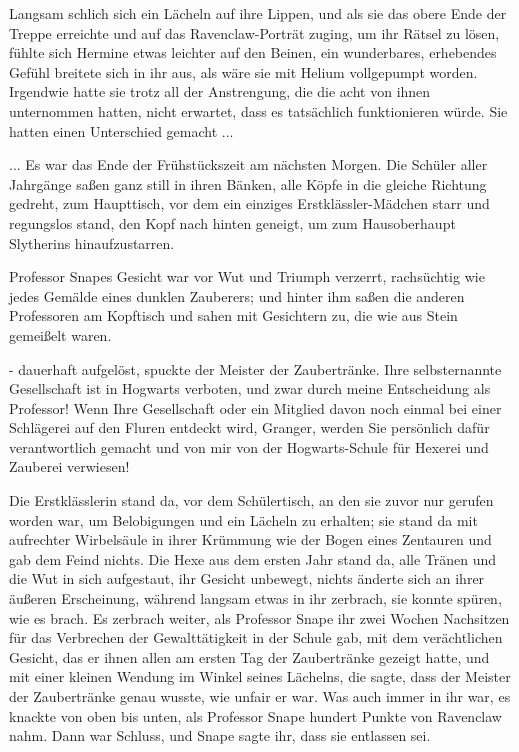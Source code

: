 Langsam schlich sich ein Lächeln auf ihre Lippen, und als sie das obere Ende der
Treppe erreichte und auf das Ravenclaw-Porträt zuging, um ihr Rätsel zu lösen,
fühlte sich Hermine etwas leichter auf den Beinen, ein wunderbares, erhebendes
Gefühl breitete sich in ihr aus, als wäre sie mit Helium vollgepumpt worden.
Irgendwie hatte sie trotz all der Anstrengung, die die acht von ihnen
unternommen hatten, nicht erwartet, dass es tatsächlich funktionieren würde. Sie
hatten einen Unterschied gemacht ...

... Es war das Ende der Frühstückszeit am nächsten Morgen. Die Schüler aller
Jahrgänge saßen ganz still in ihren Bänken, alle Köpfe in die gleiche Richtung
gedreht, zum Haupttisch, vor dem ein einziges Erstklässler-Mädchen starr und
regungslos stand, den Kopf nach hinten geneigt, um zum Hausoberhaupt Slytherins
hinaufzustarren.

Professor Snapes Gesicht war vor Wut und Triumph verzerrt, rachsüchtig wie jedes
Gemälde eines dunklen Zauberers; und hinter ihm saßen die anderen Professoren am
Kopftisch und sahen mit Gesichtern zu, die wie aus Stein gemeißelt waren.

\glqq{}- dauerhaft aufgelöst\grqq{}, spuckte der Meister der Zaubertränke. \glqq{}
Ihre selbsternannte Gesellschaft ist in Hogwarts verboten, und zwar durch meine
Entscheidung als Professor! Wenn Ihre Gesellschaft oder ein Mitglied davon noch
einmal bei einer Schlägerei auf den Fluren entdeckt wird, Granger, werden Sie
persönlich dafür verantwortlich gemacht und von mir von der Hogwarts-Schule für
Hexerei und Zauberei verwiesen!\grqq{}

Die Erstklässlerin stand da, vor dem Schülertisch, an den sie zuvor nur gerufen
worden war, um Belobigungen und ein Lächeln zu erhalten; sie stand da mit
aufrechter Wirbelsäule in ihrer Krümmung wie der Bogen eines Zentauren und gab
dem Feind nichts. Die Hexe aus dem ersten Jahr stand da, alle Tränen und die Wut
in sich aufgestaut, ihr Gesicht unbewegt, nichts änderte sich an ihrer äußeren
Erscheinung, während langsam etwas in ihr zerbrach, sie konnte spüren, wie es
brach. Es zerbrach weiter, als Professor Snape ihr zwei Wochen Nachsitzen für
das Verbrechen der Gewalttätigkeit in der Schule gab, mit dem verächtlichen
Gesicht, das er ihnen allen am ersten Tag der Zaubertränke gezeigt hatte, und
mit einer kleinen Wendung im Winkel seines Lächelns, die sagte, dass der Meister
der Zaubertränke genau wusste, wie unfair er war. Was auch immer in ihr war, es
knackte von oben bis unten, als Professor Snape hundert Punkte von Ravenclaw
nahm. Dann war Schluss, und Snape sagte ihr, dass sie entlassen sei.

